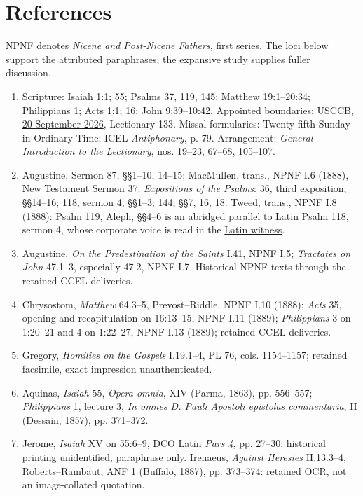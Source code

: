 \section*{References}
NPNF denotes \textit{Nicene and Post-Nicene Fathers}, first series. The loci below support the attributed paraphrases; the expansive study supplies fuller discussion.
\begin{enumerate}[leftmargin=1.6em,itemsep=0.25em,parsep=0pt]
\item Scripture: Isaiah 1:1; 55; Psalms 37, 119, 145; Matthew 19:1--20:34; Philippians 1; Acts 1:1; 16; John 9:39--10:42. Appointed boundaries: USCCB, \href{https://bible.usccb.org/bible/readings/092026.cfm}{20 September 2026}, Lectionary 133. Missal formularies: Twenty-fifth Sunday in Ordinary Time; ICEL \textit{Antiphonary}, p. 79. Arrangement: \textit{General Introduction to the Lectionary}, nos. 19--23, 67--68, 105--107.
\item Augustine, Sermon 87, §§1--10, 14--15; MacMullen, trans., NPNF I.6 (1888), New Testament Sermon 37. \textit{Expositions of the Psalms}: 36, third exposition, §§14--16; 118, sermon 4, §§1--3; 144, §§7, 16, 18. Tweed, trans., NPNF I.8 (1888): Psalm 119, Aleph, §§4--6 is an abridged parallel to Latin Psalm 118, sermon 4, whose corporate voice is read in the \href{https://www.augustinus.it/latino/esposizioni_salmi/esposizione_salmo_148_testo.htm}{Latin witness}.
\item Augustine, \textit{On the Predestination of the Saints} I.41, NPNF I.5; \textit{Tractates on John} 47.1--3, especially 47.2, NPNF I.7. Historical NPNF texts through the retained CCEL deliveries.
\item Chrysostom, \textit{Matthew} 64.3--5, Prevost--Riddle, NPNF I.10 (1888); \textit{Acts} 35, opening and recapitulation on 16:13--15, NPNF I.11 (1889); \textit{Philippians} 3 on 1:20--21 and 4 on 1:22--27, NPNF I.13 (1889); retained CCEL deliveries.
\item Gregory, \textit{Homilies on the Gospels} I.19.1--4, PL 76, cols. 1154--1157; retained facsimile, exact impression unauthenticated.
\item Aquinas, \textit{Isaiah} 55, \textit{Opera omnia}, XIV (Parma, 1863), pp. 556--557; \textit{Philippians} 1, lecture 3, \textit{In omnes D. Pauli Apostoli epistolas commentaria}, II (Dessain, 1857), pp. 371--372.
\item Jerome, \textit{Isaiah} XV on 55:6--9, DCO Latin \textit{Pars 4}, pp. 27--30: historical printing unidentified, paraphrase only. Irenaeus, \textit{Against Heresies} II.13.3--4, Roberts--Rambaut, ANF 1 (Buffalo, 1887), pp. 373--374: retained OCR, not an image-collated quotation.

\end{enumerate}
